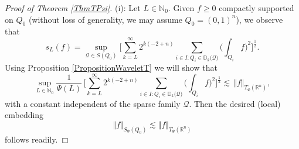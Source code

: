 \documentclass[11pt, a4paper,leqno]{amsart}
\theoremstyle{plain}
\numberwithin{equation}{section}
\theoremstyle{definition}
\theoremstyle{remark}
\begin{document}
\begin{proof}[Proof of Theorem \ref{ThmTPsi}]
(i): Let  $L\in\mathbb{N}_{0}$.  Given $f \geq 0$ compactly supported on $Q_0$ (without loss of generality, we may assume $Q_0 = (0, 1)^n$), we observe
that
\begin{equation*}
s_{L}(f)    = \sup_{\mathcal{Q} \in S(Q_0)}  \bigg[\sum_{k=L}^{\infty}2^{k(-2+n)}\sum_{i\in I:Q_{i}\in\mathbb{D}%
_{k}(\mathcal{Q)}}\bigg(\int_{Q_{i}}f\bigg)^{2}\bigg]^{\frac{1}{2}}.
\end{equation*}
Using Proposition \ref{PropositionWaveletT} we will show that%
\begin{equation}
\sup_{L\in\mathbb{N}_{0}}\frac{1}{\Psi(L)}\,\bigg[\sum_{k=L}^{\infty
}2^{k(-2+n)}\sum_{i\in I:Q_{i}\in\mathbb{D}_{k}(\mathcal{Q)}}\bigg(\int%
_{Q_{i}}f\bigg)^{2}\bigg]^{\frac{1}{2}}\lesssim\,\Vert f\Vert_{T_{\Psi
}(\mathbb{R}^{n})}, \label{ProofThm1T1}%
\end{equation}
with a constant independent of the sparse family $\mathcal{Q}$. Then the desired
(local) embedding
\[
\Vert f\Vert_{S_{\Psi}(Q_{0})}\lesssim\Vert f\Vert_{T_{\Psi
}(\mathbb{R}^{n})}
\]
follows readily. 


\end{proof}
\end{document}
